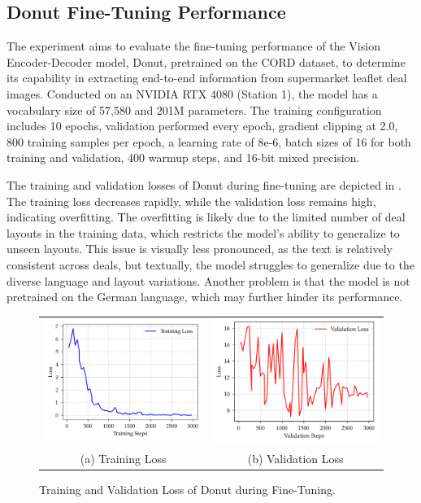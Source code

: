 \documentclass[11pt]{article}
\begin{document}
\subsection{Donut Fine-Tuning Performance}
The experiment aims to evaluate the fine-tuning performance of the Vision Encoder-Decoder model, Donut, pretrained on the CORD dataset, to determine its capability in extracting end-to-end information from supermarket leaflet deal images. Conducted on an NVIDIA RTX 4080 (Station 1), the model has a vocabulary size of 57,580 and 201M parameters. The training configuration includes 10 epochs, validation performed every epoch, gradient clipping at 2.0, 800 training samples per epoch, a learning rate of 8e-6, batch sizes of 16 for both training and validation, 400 warmup steps, and 16-bit mixed precision.

 The training and validation losses of Donut during fine-tuning are depicted in . The training loss decreases rapidly, while the validation loss remains high, indicating overfitting. The overfitting is likely due to the limited number of deal layouts in the training data, which restricts the model's ability to generalize to unseen layouts. This issue is visually less pronounced, as the text is relatively consistent across deals, but textually, the model struggles to generalize due to the diverse language and layout variations. Another problem is that the model is not pretrained on the German language, which may further hinder its performance.

\begin{figure}[h!]
    \begin{tabular}{cc}
    \includegraphics[width=0.4\linewidth]{figures/donut_train_loss.png} &\includegraphics[width=0.4\linewidth]{figures/donut_val_loss.png} \\
    (a) Training Loss & (b) Validation Loss \\[6pt]
    \end{tabular}
    \caption{Training and Validation Loss of Donut during Fine-Tuning.}
    \label{fig:donut_loss}
\end{figure}
\end{document}
